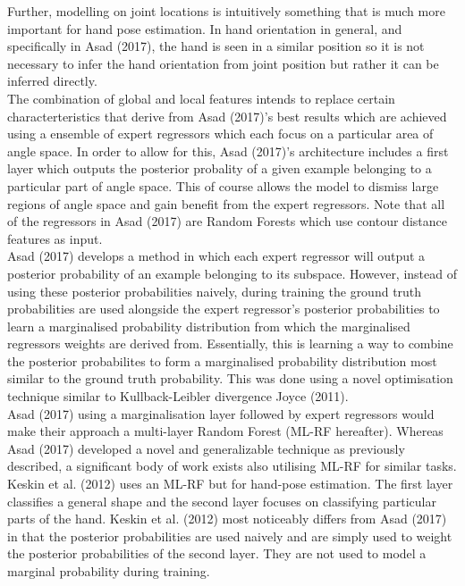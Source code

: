\documentclass{article}
\begin{document}
Further, modelling on joint locations is intuitively something that is much more important for hand pose estimation. In hand orientation in general, and specifically in Asad (2017), the hand is seen in a similar position so it is not necessary to infer the hand orientation from joint position but rather it can be inferred directly.\\

The combination of global and local features intends to replace certain characterteristics that derive from Asad (2017)'s best results which are achieved using a ensemble of expert regressors which each focus on a particular area of angle space.  In order to allow for this, Asad (2017)'s architecture includes a first layer which outputs the posterior probality of a given example belonging to a particular part of angle space. This of course allows the model to dismiss large regions of angle space and gain benefit from the expert regressors. Note that all of the regressors in Asad (2017) are Random Forests which use contour distance features as input. \\

Asad (2017) develops a method in which each expert regressor will output a posterior probability of an example belonging to its subspace. However, instead of using these posterior probabilities naively, during training the ground truth probabilities are used alongside the expert regressor's posterior probabilities to learn a marginalised probability distribution from which the marginalised regressors weights are derived from. Essentially, this is learning a way to combine the  posterior probabilites to form a marginalised probability distribution most similar to the ground truth probability. This was done using a novel optimisation technique similar to  Kullback-Leibler divergence Joyce (2011). \\

Asad (2017) using a marginalisation layer followed by expert regressors would make their approach a multi-layer Random Forest (ML-RF hereafter). Whereas Asad (2017) developed a novel and generalizable technique as previously described, a significant body of work exists also utilising ML-RF for similar tasks. Keskin et al. (2012) uses an ML-RF but for hand-pose estimation. The first layer classifies a general shape and the second layer focuses on classifying particular parts of the hand. Keskin et al. (2012) most noticeably differs from Asad (2017) in that the posterior probabilities are used naively and are simply used to weight the posterior probabilities of the second layer. They are not used to model a marginal probability during training. \\
\end{document}

